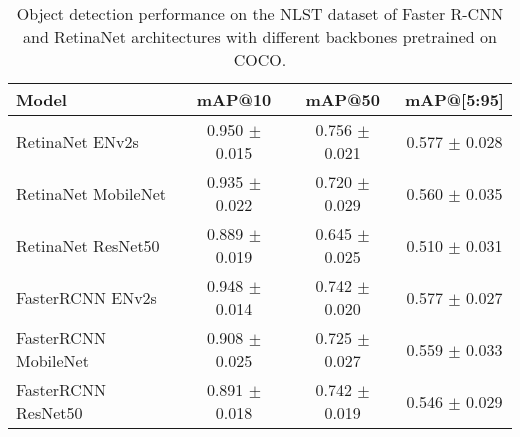 \begin{table}[h]
    \centering
    \begin{tabular}{lccc}
        \hline
        \textbf{Model} & \textbf{mAP@10} & \textbf{mAP@50} & \textbf{mAP@[5:95]} \\
        \hline
        \rowcolor{yellow!20}
        RetinaNet ENv2s      & 0.950 $\pm$ 0.015 & 0.756 $\pm$ 0.021 & 0.577 $\pm$ 0.028 \\
        RetinaNet MobileNet  & 0.935 $\pm$ 0.022 & 0.720 $\pm$ 0.029 & 0.560 $\pm$ 0.035 \\
        RetinaNet ResNet50   & 0.889 $\pm$ 0.019 & 0.645 $\pm$ 0.025 & 0.510 $\pm$ 0.031 \\
        FasterRCNN ENv2s     & 0.948 $\pm$ 0.014 & 0.742 $\pm$ 0.020 & 0.577 $\pm$ 0.027 \\
        FasterRCNN MobileNet & 0.908 $\pm$ 0.025 & 0.725 $\pm$ 0.027 & 0.559 $\pm$ 0.033 \\
        FasterRCNN ResNet50  & 0.891 $\pm$ 0.018 & 0.742 $\pm$ 0.019 & 0.546 $\pm$ 0.029 \\
        \hline
    \end{tabular}
    \caption{Object detection performance on the NLST dataset of Faster R-CNN and RetinaNet architectures with different backbones pretrained on COCO.}
    \label{tab:nlst-models}
\end{table}
